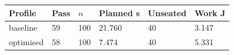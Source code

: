 \begin{tabular}{llllll}
\toprule
Profile & Pass & $n$ & Planned s & Unseated & Work J \\
\midrule
baseline & 59 & 100 & 21.760 & 40 & 3.147 \\
optimised & 58 & 100 & 7.474 & 40 & 5.331 \\
\bottomrule
\end{tabular}
